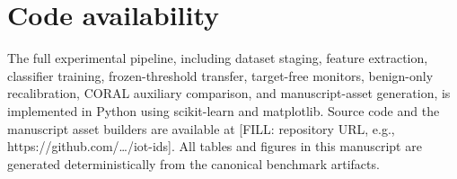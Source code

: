 \documentclass[preprint,12pt]{elsarticle}
\begin{document}
\section*{Code availability}

The full experimental pipeline, including dataset staging, feature extraction, classifier training, frozen-threshold transfer, target-free monitors, benign-only recalibration, CORAL auxiliary comparison, and manuscript-asset generation, is implemented in Python using scikit-learn and matplotlib. Source code and the manuscript asset builders are available at [FILL: repository URL, e.g., https://github.com/\ldots/iot-ids]. All tables and figures in this manuscript are generated deterministically from the canonical benchmark artifacts.



\end{document}

